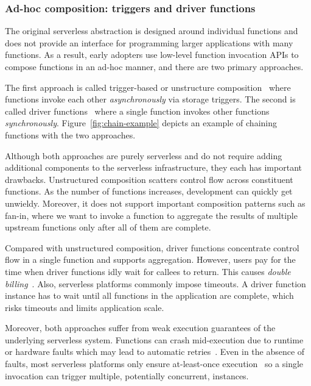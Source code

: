\subsubsection{Ad-hoc composition: triggers and driver functions}

The original serverless abstraction is designed around individual functions
and does not provide an interface for programming larger applications with
many functions. As a result, early adopters use low-level function invocation
APIs to compose functions in an ad-hoc manner, and there are two primary
approaches.

The first approach is called trigger-based or unstructure
composition~\cite{netherite} where functions invoke each other
\emph{asynchronously} via storage triggers. The second is called driver
functions~\cite{beldi} where a single function invokes other functions
\emph{synchronously}. Figure~\ref{fig:chain-example} depicts an example of
chaining functions with the two approaches.

Although both approaches are purely serverless and do not require adding
additional components to the serverless infrastructure, they each has
important drawbacks. Unstructured composition scatters control flow across
constituent functions. As the number of functions increases, development can
quickly get unwieldy. Moreover, it does not support important composition
patterns such as fan-in, where we want to invoke a function to aggregate the
results of multiple upstream functions only after all of them are complete.


Compared with unstructured composition, driver functions concentrate control
flow in a single function and supports aggregation. However, users pay for the
time when driver functions idly wait for callees to return. This causes
\emph{double billing}~\cite{double-billing}. Also, serverless platforms
commonly impose timeouts. A driver function instance has to wait until all
functions in the application are complete, which risks timeouts and limits
application scale.

Moreover, both approaches suffer from weak execution guarantees of the
underlying serverless system. Functions can crash mid-execution due to runtime
or hardware faults which may lead to automatic retries~\cite{aws-lambda-retry,
azure-functions-retry}. Even in the absence of faults, most serverless
platforms only ensure at-least-once execution~\cite{aws-lambda-async-invoke,
azure-functions-exec-guarantee} so a single invocation can trigger multiple,
potentially concurrent, instances.


